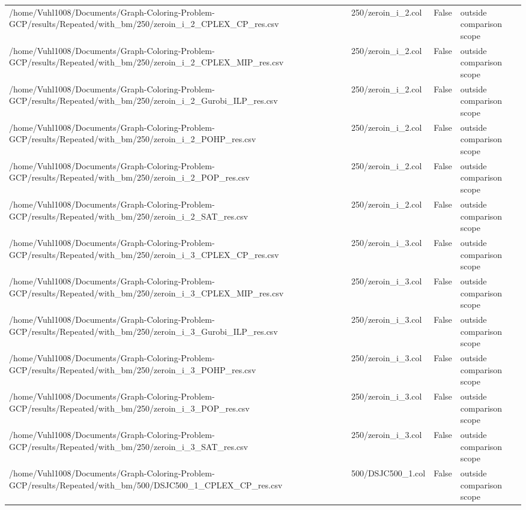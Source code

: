 \begin{table}[htbp]
\begin{tabular}{llll}
/home/Vuhl1008/Documents/Graph-Coloring-Problem-GCP/results/Repeated/with\_bm/250/zeroin\_i\_2\_CPLEX\_CP\_res.csv & 250/zeroin\_i\_2.col & False & outside comparison scope \\
/home/Vuhl1008/Documents/Graph-Coloring-Problem-GCP/results/Repeated/with\_bm/250/zeroin\_i\_2\_CPLEX\_MIP\_res.csv & 250/zeroin\_i\_2.col & False & outside comparison scope \\
/home/Vuhl1008/Documents/Graph-Coloring-Problem-GCP/results/Repeated/with\_bm/250/zeroin\_i\_2\_Gurobi\_ILP\_res.csv & 250/zeroin\_i\_2.col & False & outside comparison scope \\
/home/Vuhl1008/Documents/Graph-Coloring-Problem-GCP/results/Repeated/with\_bm/250/zeroin\_i\_2\_POHP\_res.csv & 250/zeroin\_i\_2.col & False & outside comparison scope \\
/home/Vuhl1008/Documents/Graph-Coloring-Problem-GCP/results/Repeated/with\_bm/250/zeroin\_i\_2\_POP\_res.csv & 250/zeroin\_i\_2.col & False & outside comparison scope \\
/home/Vuhl1008/Documents/Graph-Coloring-Problem-GCP/results/Repeated/with\_bm/250/zeroin\_i\_2\_SAT\_res.csv & 250/zeroin\_i\_2.col & False & outside comparison scope \\
/home/Vuhl1008/Documents/Graph-Coloring-Problem-GCP/results/Repeated/with\_bm/250/zeroin\_i\_3\_CPLEX\_CP\_res.csv & 250/zeroin\_i\_3.col & False & outside comparison scope \\
/home/Vuhl1008/Documents/Graph-Coloring-Problem-GCP/results/Repeated/with\_bm/250/zeroin\_i\_3\_CPLEX\_MIP\_res.csv & 250/zeroin\_i\_3.col & False & outside comparison scope \\
/home/Vuhl1008/Documents/Graph-Coloring-Problem-GCP/results/Repeated/with\_bm/250/zeroin\_i\_3\_Gurobi\_ILP\_res.csv & 250/zeroin\_i\_3.col & False & outside comparison scope \\
/home/Vuhl1008/Documents/Graph-Coloring-Problem-GCP/results/Repeated/with\_bm/250/zeroin\_i\_3\_POHP\_res.csv & 250/zeroin\_i\_3.col & False & outside comparison scope \\
/home/Vuhl1008/Documents/Graph-Coloring-Problem-GCP/results/Repeated/with\_bm/250/zeroin\_i\_3\_POP\_res.csv & 250/zeroin\_i\_3.col & False & outside comparison scope \\
/home/Vuhl1008/Documents/Graph-Coloring-Problem-GCP/results/Repeated/with\_bm/250/zeroin\_i\_3\_SAT\_res.csv & 250/zeroin\_i\_3.col & False & outside comparison scope \\
/home/Vuhl1008/Documents/Graph-Coloring-Problem-GCP/results/Repeated/with\_bm/500/DSJC500\_1\_CPLEX\_CP\_res.csv & 500/DSJC500\_1.col & False & outside comparison scope \\

\end{tabular}
\end{table}
